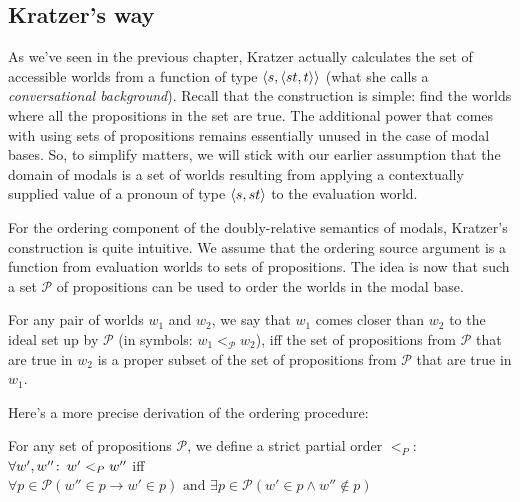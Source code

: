 \subsection{Kratzer's way}
\label{sec:kratzer-way}

As we've seen in the previous chapter, Kratzer actually calculates the set of
accessible worlds from a function of type $\langle s,\langle st,t \rangle \rangle$ (what she calls
a \emph{conversational background}). Recall that the construction is simple:
find the worlds where all the propositions in the set are true. The additional
power that comes with using sets of propositions remains essentially unused in
the case of modal bases. So, to simplify matters, we will stick with our earlier
assumption that the domain of modals is a set of worlds resulting from applying
a contextually supplied value of a pronoun of type $\langle s,st \rangle$ to the
evaluation world.

%
For the ordering component of the doubly-relative semantics of modals, Kratzer's
construction is quite intuitive. We assume that the ordering source argument is
a function from evaluation worlds to sets of propositions. The idea is now that
such a set $\mathcal{P}$ of propositions can be used to order the worlds in the
modal base.

For any pair of worlds $w_1$ and $w_2$, we say that $w_1$ comes closer than
$w_2$ to the ideal set up by $\mathcal{P}$ (in symbols:
$w_1 <_{\mathcal{P}} w_2$), iff the set of propositions from $\mathcal{P}$ that
are true in $w_2$ is a proper subset of the set of propositions from
$\mathcal{P}$ that are true in $w_1$.

Here's a more precise derivation of the ordering procedure:

\ex For any set of propositions $\mathcal{P}$, we define a strict partial order
$<_P$:\\
    \(\forall w', w''\co w' <_P w''\) iff \\
    \hfill \(\forall p \in \mathcal{P} \left( w'' \in p \rightarrow w' \in p \right)
    \mbox{ and } \exists p \in \mathcal{P} \left( w' \in p \wedge w'' \not\in p
    \right)\)

